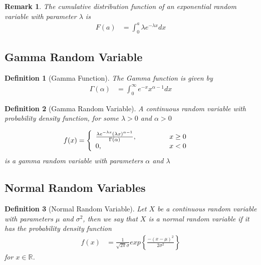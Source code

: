 \documentclass[11pt, oneside]{book}   	%
\newtheorem{definition}{Definition}[chapter]
\newtheorem{remark}{Remark}[chapter]
\begin{document}
\begin{spacing}{1.618}
\begin{remark}
	The cumulative distribution function of an exponential random variable with parameter $\lambda$ is 
	\begin{alignat}{4}
		F(a)&=\int_0^a\lambda e^{-\lambda x} dx
	\end{alignat}
\end{remark}

\subsection{Gamma Random Variable}

\begin{definition}[Gamma Function]
	The Gamma function is given by 
	\begin{alignat}{4}
		\Gamma(\alpha)&=\int_0^\infty e^{-x}x^{\alpha - 1} dx
	\end{alignat}
\end{definition}

\begin{definition}[Gamma Random Variable]
	A continuous random variable with probability density function, for some $\lambda > 0$ and $\alpha > 0$ 
	
	\begin{alignat}{4}
		f(x)&=\left\{\begin{array}{lll}
			\frac{\lambda e^{-\lambda x} (\lambda x)^{\alpha-1}}{\Gamma(\alpha)},&\hspace{1 cm}& x\geq 0 \\
			0,&\hspace{1 cm}& x< 0
		\end{array}\right.
	\end{alignat}
	is a \emph{gamma random variable} with parameters $\alpha$ and $\lambda$
\end{definition}

\subsection{Normal Random Variables}

\begin{definition}[Normal Random Variable]
	Let $X$ be a continuous random variable with parameters $\mu$ and $\sigma^2$, then we say that $X$ is a normal random variable if it has the probability density function
	\begin{alignat}{4}
		f(x)&=\frac{1}{\sqrt{2\pi}\sigma}exp\left\{\frac{-(x-\mu)^2}{2\sigma^2}\right\}
	\end{alignat}
	for $x\in\mathbb{R}$. 
\end{definition}


\end{spacing}
\end{document}
